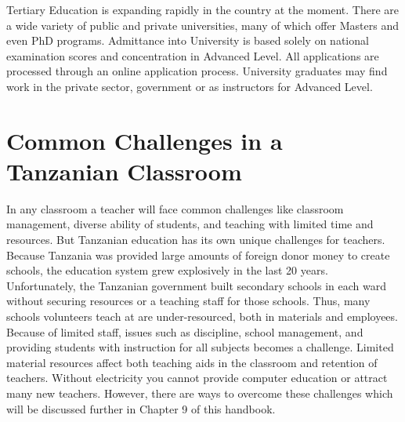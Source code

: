 Tertiary Education is expanding rapidly in the country at the moment.  There are a wide variety of public and private universities, many of which offer Masters and even PhD programs.  Admittance into University is based solely on national examination scores and concentration in Advanced Level.  All applications are processed through an online application process.  University graduates may find work in the private sector, government or as instructors for Advanced Level.

\section{Common Challenges in a Tanzanian Classroom}
In any classroom a teacher will face common challenges like classroom management, diverse ability of students, and teaching with limited time and resources.  But Tanzanian education has its own unique challenges for teachers.  Because Tanzania was provided large amounts of foreign donor money to create schools, the education system grew explosively in the last 20 years.  Unfortunately, the Tanzanian government built secondary schools in each ward without securing resources or a teaching staff for those schools.  Thus, many schools volunteers teach at are under-resourced, both in materials and employees.  Because of limited staff, issues such as discipline, school management, and providing students with instruction for all subjects becomes a challenge.   Limited material resources affect both teaching aids in the classroom and retention of teachers.  Without electricity you cannot provide computer education or attract many new teachers.  However, there are ways to overcome these challenges which will be discussed further in Chapter 9 of this handbook.

\begin{center}
\setlength\fboxsep{0pt}
\setlength\fboxrule{2pt}
\end{center}

